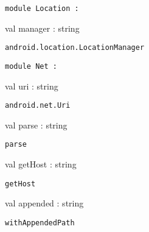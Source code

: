 \documentclass[11pt]{article}
\begin{document}
\begin{ocamldoccode}
{\tt{module }}{\tt{Location}}{\tt{ : }}\end{ocamldoccode}
\label{module:Android.Location}

\begin{ocamldocsigend}


\label{val:Android.Location.manager}\begin{ocamldoccode}
val manager : string
\end{ocamldoccode}
\begin{ocamldocdescription}
{\tt{android.location.LocationManager}}


\end{ocamldocdescription}
\end{ocamldocsigend}






\begin{ocamldoccode}
{\tt{module }}{\tt{Net}}{\tt{ : }}\end{ocamldoccode}
\label{module:Android.Net}

\begin{ocamldocsigend}


\label{val:Android.Net.uri}\begin{ocamldoccode}
val uri : string
\end{ocamldoccode}
\begin{ocamldocdescription}
{\tt{android.net.Uri}}


\end{ocamldocdescription}


\label{val:Android.Net.parse}\begin{ocamldoccode}
val parse : string
\end{ocamldoccode}
\begin{ocamldocdescription}
{\tt{parse}}


\end{ocamldocdescription}


\label{val:Android.Net.getHost}\begin{ocamldoccode}
val getHost : string
\end{ocamldoccode}
\begin{ocamldocdescription}
{\tt{getHost}}


\end{ocamldocdescription}


\label{val:Android.Net.appended}\begin{ocamldoccode}
val appended : string
\end{ocamldoccode}
\begin{ocamldocdescription}
{\tt{withAppendedPath}}


\end{ocamldocdescription}
\end{ocamldocsigend}
\end{document}
